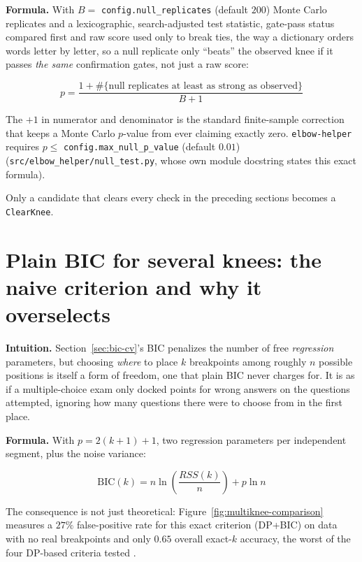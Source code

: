 \documentclass[11pt]{article}
\newcommand{\code}[1]{\texttt{#1}}
\begin{document}
\textbf{Formula.} With $B = $ \code{config.null\_replicates} (default
$200$) Monte Carlo replicates and a lexicographic, search-adjusted test
statistic, gate-pass status compared first and raw score used only to
break ties, the way a dictionary orders words letter by letter, so a
null replicate only ``beats'' the observed knee if it passes
\emph{the same} confirmation gates, not just a raw score:

\begin{equation}
p = \frac{1 + \#\{\text{null replicates at least as strong as observed}\}}{B + 1}
\end{equation}

The $+1$ in numerator and denominator is the standard finite-sample
correction that keeps a Monte Carlo $p$-value from ever claiming exactly
zero. \code{elbow-helper} requires $p \le$ \code{config.\allowbreak max\_null\_p\_value}
(default $0.01$) (\code{src/elbow\_helper/\allowbreak null\_test.py}, whose own module
docstring states this exact formula).

Only a candidate that clears every check in the preceding sections becomes
a \code{ClearKnee}.

\section{Plain BIC for several knees: the naive criterion and why it overselects}
\label{sec:several-bic}

\textbf{Intuition.} Section~\ref{sec:bic-cv}'s BIC penalizes the number of
free \emph{regression} parameters, but choosing \emph{where} to place $k$
breakpoints among roughly $n$ possible positions is itself a form of
freedom, one that plain BIC never charges for. It is as if a
multiple-choice exam only docked points for wrong answers on the questions
attempted, ignoring how many questions there were to choose from in the
first place.

\textbf{Formula.} With $p = 2(k+1) + 1$, two regression parameters per
independent segment, plus the noise variance:

\begin{equation}
\mathrm{BIC}(k) = n \ln\!\left(\frac{RSS(k)}{n}\right) + p \ln n
\end{equation}

The consequence is not just theoretical: Figure~\ref{fig:multiknee-comparison}
measures a $27\%$ false-positive rate for this exact criterion (DP+BIC)
on data with no real breakpoints and only $0.65$ overall exact-$k$
accuracy, the worst of the four DP-based criteria tested
\citep{yao1988} \citep{zhangsiegmund2007}.
\end{document}
